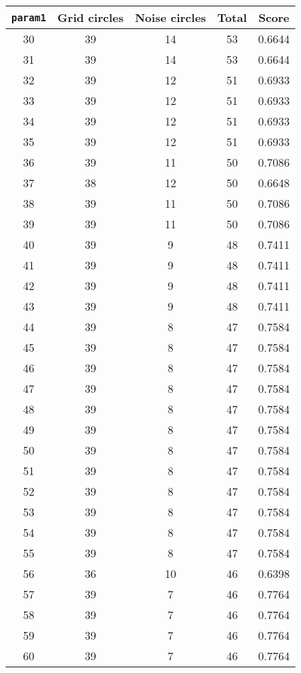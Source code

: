 \documentclass[letterpaper, 12pt]{article}
\begin{document}
\begin{longtable}{|c|c|c|c|c|}
\hline
\textbf{\texttt{param1}} & \textbf{Grid circles} & \textbf{Noise circles} & \textbf{Total} & \textbf{Score} \\
\hline
30 & 39 & 14 & 53 & 0.6644 \\
\hline
31 & 39 & 14 & 53 & 0.6644 \\
\hline
32 & 39 & 12 & 51 & 0.6933 \\
\hline
33 & 39 & 12 & 51 & 0.6933 \\
\hline
34 & 39 & 12 & 51 & 0.6933 \\
\hline
35 & 39 & 12 & 51 & 0.6933 \\
\hline
36 & 39 & 11 & 50 & 0.7086 \\
\hline
37 & 38 & 12 & 50 & 0.6648 \\
\hline
38 & 39 & 11 & 50 & 0.7086 \\
\hline
39 & 39 & 11 & 50 & 0.7086 \\
\hline
40 & 39 & 9 & 48 & 0.7411 \\
\hline
41 & 39 & 9 & 48 & 0.7411 \\
\hline
42 & 39 & 9 & 48 & 0.7411 \\
\hline
43 & 39 & 9 & 48 & 0.7411 \\
\hline
44 & 39 & 8 & 47 & 0.7584 \\
\hline
45 & 39 & 8 & 47 & 0.7584 \\
\hline
46 & 39 & 8 & 47 & 0.7584 \\
\hline
47 & 39 & 8 & 47 & 0.7584 \\
\hline
48 & 39 & 8 & 47 & 0.7584 \\
\hline
49 & 39 & 8 & 47 & 0.7584 \\
\hline
50 & 39 & 8 & 47 & 0.7584 \\
\hline
51 & 39 & 8 & 47 & 0.7584 \\
\hline
52 & 39 & 8 & 47 & 0.7584 \\
\hline
53 & 39 & 8 & 47 & 0.7584 \\
\hline
54 & 39 & 8 & 47 & 0.7584 \\
\hline
55 & 39 & 8 & 47 & 0.7584 \\
\hline
56 & 36 & 10 & 46 & 0.6398 \\
\hline
57 & 39 & 7 & 46 & 0.7764 \\
\hline
58 & 39 & 7 & 46 & 0.7764 \\
\hline
59 & 39 & 7 & 46 & 0.7764 \\
\hline
60 & 39 & 7 & 46 & 0.7764 \\
\hline

\end{longtable}
\end{document}
